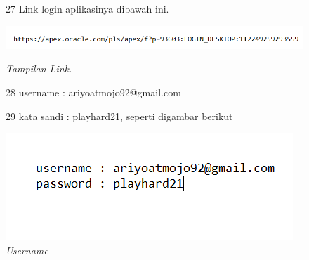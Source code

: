 \begin{enumerate}
\begin{figure}
\item[27]Link login aplikasinya dibawah ini.
    \begin{center}
\includegraphics[scale=0.7]{figures/link.PNG}
    \caption{\textit{Tampilan Link.}}
        \end{center}
\item[28] username   : ariyoatmojo92@gmail.com
\item[29] kata sandi : playhard21, seperti digambar berikut
    \begin{center}
\includegraphics[scale=0.9]{figures/login.PNG}
    \caption{\textit{Username}}
        \end{center}
\label{gambar}
\end{figure}

\end{enumerate}
